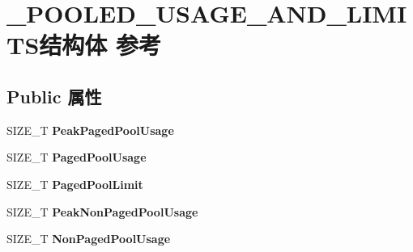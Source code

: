 \hypertarget{struct___p_o_o_l_e_d___u_s_a_g_e___a_n_d___l_i_m_i_t_s}{}\section{\+\_\+\+P\+O\+O\+L\+E\+D\+\_\+\+U\+S\+A\+G\+E\+\_\+\+A\+N\+D\+\_\+\+L\+I\+M\+I\+T\+S结构体 参考}
\label{struct___p_o_o_l_e_d___u_s_a_g_e___a_n_d___l_i_m_i_t_s}
\subsection*{Public 属性}
\begin{DoxyCompactItemize}
\item 
\mbox{\label{struct___p_o_o_l_e_d___u_s_a_g_e___a_n_d___l_i_m_i_t_s_ad5d0983c7e551b01d1bf1f2a1fd5f6d0}} 
S\+I\+Z\+E\+\_\+T {\bfseries Peak\+Paged\+Pool\+Usage}
\item 
\mbox{\label{struct___p_o_o_l_e_d___u_s_a_g_e___a_n_d___l_i_m_i_t_s_af48fcb1c0f4857a7fa65f3431c11bb23}} 
S\+I\+Z\+E\+\_\+T {\bfseries Paged\+Pool\+Usage}
\item 
\mbox{\label{struct___p_o_o_l_e_d___u_s_a_g_e___a_n_d___l_i_m_i_t_s_afb868b650d446fb8a7f886b3ce05395f}} 
S\+I\+Z\+E\+\_\+T {\bfseries Paged\+Pool\+Limit}
\item 
\mbox{\label{struct___p_o_o_l_e_d___u_s_a_g_e___a_n_d___l_i_m_i_t_s_a93ad76cc91af3cc0406ee3b09e34362f}} 
S\+I\+Z\+E\+\_\+T {\bfseries Peak\+Non\+Paged\+Pool\+Usage}
\item 
\mbox{\label{struct___p_o_o_l_e_d___u_s_a_g_e___a_n_d___l_i_m_i_t_s_a53b8efd7504d6e8b14688d71829f9762}} 
S\+I\+Z\+E\+\_\+T {\bfseries Non\+Paged\+Pool\+Usage}
\item 
\mbox{\label{struct___p_o_o_l_e_d___u_s_a_g_e___a_n_d___l_i_m_i_t_s_a24393e1919644633432888e49f9e2bf8}} 

\end{DoxyCompactItemize}
